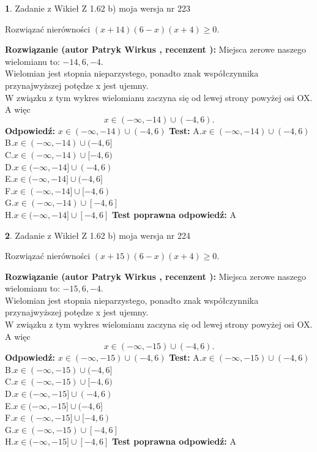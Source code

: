 \documentclass[12pt, a4paper]{article}
\theoremstyle{definition} %
\newtheorem{zad}{}
\newcommand{\zadStart}[1]{\begin{zad}#1\newline}
\newcommand{\zadStop}{\end{zad}}
\newcommand{\rozwStart}[2]{\noindent \textbf{Rozwiązanie (autor #1 , recenzent #2): }\newline}
\newcommand{\rozwStop}{\newline}
\newcommand{\odpStart}{\noindent \textbf{Odpowiedź:}\newline}
\newcommand{\odpStop}{\newline}
\newcommand{\testStart}{\noindent \textbf{Test:}\newline}
\newcommand{\testStop}{\newline}
\newcommand{\kluczStart}{\noindent \textbf{Test poprawna odpowiedź:}\newline}
\newcommand{\kluczStop}{\newline}
\begin{document}
\zadStart{Zadanie z Wikieł Z 1.62 b) moja wersja nr 223}

Rozwiązać nierówności $(x+14)(6-x)(x+4)\ge0$.
\zadStop
\rozwStart{Patryk Wirkus}{}
Miejsca zerowe naszego wielomianu to: $-14, 6, -4$.\\
Wielomian jest stopnia nieparzystego, ponadto znak współczynnika przy\linebreak najwyższej potędze x jest ujemny.\\ W związku z tym wykres wielomianu zaczyna się od lewej strony powyżej osi OX. A więc $$x \in (-\infty,-14) \cup (-4,6).$$
\rozwStop
\odpStart
$x \in (-\infty,-14) \cup (-4,6)$
\odpStop
\testStart
A.$x \in (-\infty,-14) \cup (-4,6)$\\
B.$x \in (-\infty,-14) \cup (-4,6]$\\
C.$x \in (-\infty,-14) \cup [-4,6)$\\
D.$x \in (-\infty,-14] \cup (-4,6)$\\
E.$x \in (-\infty,-14] \cup (-4,6]$\\
F.$x \in (-\infty,-14] \cup [-4,6)$\\
G.$x \in (-\infty,-14) \cup [-4,6]$\\
H.$x \in (-\infty,-14] \cup [-4,6]$
\testStop
\kluczStart
A
\kluczStop



\zadStart{Zadanie z Wikieł Z 1.62 b) moja wersja nr 224}

Rozwiązać nierówności $(x+15)(6-x)(x+4)\ge0$.
\zadStop
\rozwStart{Patryk Wirkus}{}
Miejsca zerowe naszego wielomianu to: $-15, 6, -4$.\\
Wielomian jest stopnia nieparzystego, ponadto znak współczynnika przy\linebreak najwyższej potędze x jest ujemny.\\ W związku z tym wykres wielomianu zaczyna się od lewej strony powyżej osi OX. A więc $$x \in (-\infty,-15) \cup (-4,6).$$
\rozwStop
\odpStart
$x \in (-\infty,-15) \cup (-4,6)$
\odpStop
\testStart
A.$x \in (-\infty,-15) \cup (-4,6)$\\
B.$x \in (-\infty,-15) \cup (-4,6]$\\
C.$x \in (-\infty,-15) \cup [-4,6)$\\
D.$x \in (-\infty,-15] \cup (-4,6)$\\
E.$x \in (-\infty,-15] \cup (-4,6]$\\
F.$x \in (-\infty,-15] \cup [-4,6)$\\
G.$x \in (-\infty,-15) \cup [-4,6]$\\
H.$x \in (-\infty,-15] \cup [-4,6]$
\testStop
\kluczStart
A
\kluczStop
\end{document}
